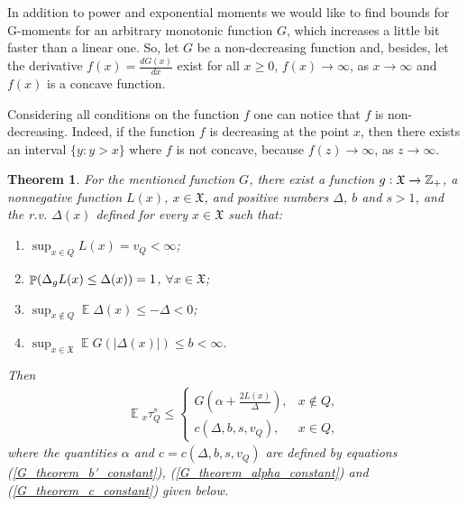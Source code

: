 \documentclass[10pt, reqno]{amsart}
\newtheorem{repeated_theorem}{Theorem}
\theoremstyle{definition}
\newcommand{\aasVar}{Q} %
\newcommand{\astVar}{\tau} %
\newcommand{\gtfVar}{G} %
\newcommand{\ltfVar}{L} %
\newcommand{\assVar}{\mathfrak{X}} %
\newcommand{\integers}{\mathbb{Z}} %
\newcommand{\gdfVar}{f} %
\newcommand{\absolute}[1]{\left|#1\right|}
\DeclareMathOperator*{\E}{\mathbb{E}}
\DeclareMathOperator*{\Pb}{\mathbb{P}}
\begin{document}
	In addition to power and exponential moments we would like to find bounds for G-moments for an arbitrary monotonic function $\gtfVar$, which increases a little bit faster than a linear one. So, let $\gtfVar$ be a non-decreasing function and, besides, let the derivative $\gdfVar(x) = \frac{d\gtfVar(x)}{dx}$ exist for all $x \geq 0$, $\gdfVar(x) \xrightarrow{} \infty$, as $x \xrightarrow{} \infty$ and $\gdfVar(x)$ is a concave function.
	
	Considering all conditions on the function $\gdfVar$ one can notice that $\gdfVar$ is non-decreasing. Indeed, if the function $\gdfVar$ is decreasing at the point $x$, then there exists an interval $\{y : y > x\}$ where $\gdfVar$ is not concave, because $\gdfVar(z) \xrightarrow{} \infty$, as $z \xrightarrow{} \infty$.
	
	\begin{repeated_theorem}
		For the mentioned function $\gtfVar$, there exist a function $\gffVar:\assVar \xrightarrow{} \integers_{+}$, a nonnegative function $\ltfVar(x)$, $x \in \assVar$, and positive numbers $\Delta$, $b$ and $s > 1$, and the r.v. $\Delta(x)$ defined for every $x \in \assVar$ such that:
		\begin{enumerate}
			\item[(a)] $\sup_{x \in \aasVar}\ltfVar(x) = v_{\aasVar} < \infty$;
			\item[(b)] $\Pb(\Delta_{\gffVar}\ltfVar(x) \leq \Delta(x)) = 1$, $\forall x \in \assVar$;
			\item[(c)] $\sup_{x \notin \aasVar}\E\Delta(x) \leq -\Delta < 0$;
			\item[(d)] $\sup_{x \in \assVar}\E\gtfVar(\absolute{\Delta(x)}) \leq b < \infty$.
		\end{enumerate}
		Then
		\begin{align}
		\E{}_{x}\astVar_{\aasVar}^{s} \leq \begin{cases}
		\gtfVar\left(\alpha + \frac{2\ltfVar(x)}{\Delta}\right), & x \notin \aasVar,\\
		c(\Delta, b, s, v_{\aasVar}), & x \in \aasVar,
		\end{cases}    \label{G_theorem_result_estimation}
		\end{align}
		where the quantities $\alpha$ and $c = c(\Delta, b, s, v_{\aasVar})$ are defined by equations (\ref{G_theorem_b'_constant}), (\ref{G_theorem_alpha_constant}) and (\ref{G_theorem_c_constant}) given below.
	\end{repeated_theorem}
	
\end{document}

